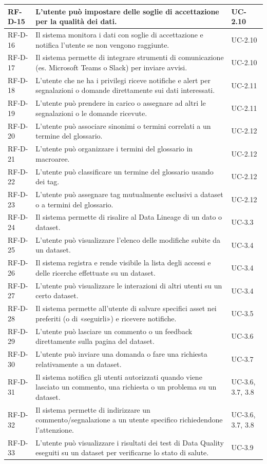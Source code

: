 \begin{longtable}{ p{} p{} p{} }
RF-D-15 & L'utente può impostare delle soglie di accettazione per la qualità dei dati. & UC-2.10 \\ \midrule
RF-D-16 & Il sistema monitora i dati con soglie di accettazione e notifica l'utente se non vengono raggiunte. & UC-2.10 \\ \midrule
RF-D-17 & Il sistema permette di integrare strumenti di comunicazione (es. Microsoft Teams o Slack) per inviare avvisi. & UC-2.10 \\ \midrule
RF-D-18 & L'utente che ne ha i privilegi riceve notifiche e alert per segnalazioni o domande direttamente sui dati interessati. & UC-2.11 \\ \midrule
RF-D-19 & L'utente può prendere in carico o assegnare ad altri le segnalazioni o le domande ricevute. & UC-2.11 \\ \midrule
RF-D-20 & L'utente può associare sinonimi o termini correlati a un termine del glossario. & UC-2.12 \\ \midrule
RF-D-21 & L'utente può organizzare i termini del glossario in macroaree. & UC-2.12 \\ \midrule
RF-D-22 & L'utente può classificare un termine del glossario usando dei tag. & UC-2.12 \\ \midrule
RF-D-23 & L'utente può assegnare tag mutualmente esclusivi a dataset o a termini del glossario. & UC-2.12 \\ \midrule
RF-D-24 & Il sistema permette di risalire al Data Lineage di un dato o dataset. & UC-3.3 \\ \midrule
RF-D-25 & L'utente può visualizzare l'elenco delle modifiche subite da un dataset. & UC-3.4 \\ \midrule
RF-D-26 & Il sistema registra e rende visibile la lista degli accessi e delle ricerche effettuate su un dataset. & UC-3.4 \\ \midrule
RF-D-27 & L'utente può visualizzare le interazioni di altri utenti su un certo dataset. & UC-3.4 \\ \midrule
RF-D-28 & Il sistema permette all'utente di salvare specifici asset nei preferiti (o di «seguirli») e ricevere notifiche. & UC-3.5 \\ \midrule
RF-D-29 & L'utente può lasciare un commento o un feedback direttamente sulla pagina del dataset. & UC-3.6 \\ \midrule
RF-D-30 & L'utente può inviare una domanda o fare una richiesta relativamente a un dataset. & UC-3.7 \\ \midrule
RF-D-31 & Il sistema notifica gli utenti autorizzati quando viene lasciato un commento, una richiesta o un problema su un dataset. & UC-3.6, 3.7, 3.8 \\ \midrule
RF-D-32 & Il sistema permette di indirizzare un commento/segnalazione a un utente specifico richiedendone l'attenzione. & UC-3.6, 3.7, 3.8 \\ \midrule
RF-D-33 & L'utente può visualizzare i risultati dei test di Data Quality eseguiti su un dataset per verificarne lo stato di salute. & UC-3.9 \\ \midrule


\end{longtable}
